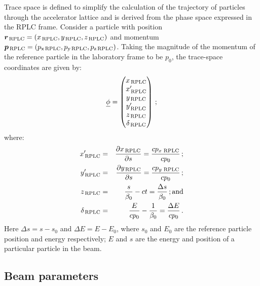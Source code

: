 Trace space is defined to simplify the calculation of the trajectory
of particles through the accelerator lattice and is derived from the
phase space expressed in the RPLC frame.
Consider a particle with position
$\bm{r}_{\rm\,RPLC}=(x_{\rm\,RPLC}, y_{\rm\,RPLC}, z_{\rm\,RPLC})$ and
momentum
$\bm{p}_{\rm\,RPLC} = (p_{\rm x\,RPLC}, p_{\rm y\,RPLC}, p_{\rm z\,RPLC})$.
Taking the magnitude of the momentum of the reference particle in the
laboratory frame to be $p_0$, the trace-space coordinates are given
by:
\begin{equation}
    \underline{\phi} = \begin{pmatrix}
                        x_{\rm\,RPLC}       \\
                        x^\prime_{\rm\,RPLC} \\
                        y_{\rm\,RPLC}       \\
                        y^\prime_{\rm\,RPLC} \\
                        z_{\rm\,RPLC}       \\
                        \delta_{\rm\,RPLC}
                      \end{pmatrix} \, ;
\end{equation}
where:
\begin{eqnarray}
  x^\prime_{\rm\,RPLC}  & = & \frac{\partial x_{\rm\,RPLC}}{\partial s}
                        = \frac{cp_{x\,{\rm\,RPLC}}}{cp_0} \, ; \\
  y^\prime_{\rm\,RPLC}  & = & \frac{\partial y_{\rm\,RPLC}}{\partial s}
                        = \frac{cp_{y\,{\rm\,RPLC}}}{cp_0} \, ; \\
  z_{\rm\,RPLC}        & = & \frac{s}{\beta_0} - ct
                       = \frac{\Delta s}{\beta_0}             \, {\rm ; and} \\
  \delta_{\rm\,RPLC}   & = & \frac{E}{c p_0} - \frac{1}{\beta_0}
                        = \frac{\Delta E}{cp_0}                   \, .    
\end{eqnarray}
Here $\Delta s = s - s_0$ and $\Delta E = E - E_0$, where $s_0$ and
$E_0$ are the reference particle position and energy respectively; $E$
and $s$ are the energy and position of a particular particle in the
beam.

\subsection{Beam parameters}

